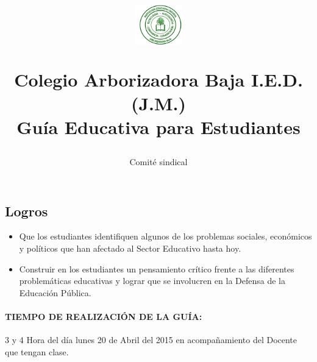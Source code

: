 \documentclass[10pt,twoside]{article}
\author{Comité sindical}
\title{\begin{minipage}{.2\textwidth}
\includegraphics[height=1.75cm]{Images/logo-colegio.png}\end{minipage}
\begin{minipage}{.75\textwidth}
\begin{center}
Colegio Arborizadora Baja I.E.D. (J.M.)\\
Guía Educativa para Estudiantes\\
\end{center}
\end{minipage}\hfill
}
\date{}
\begin{document}
\maketitle
\subsection*{Logros}
\begin{itemize}
\item Que los estudiantes identifiquen algunos de los problemas sociales, económicos y políticos  que han afectado al Sector Educativo hasta hoy.
\item Construir en los estudiantes un pensamiento crítico frente a las diferentes problemáticas educativas y lograr que se involucren en la Defensa de la Educación Pública.
\end{itemize}
\paragraph*{TIEMPO DE REALIZACIÓN DE LA GUÍA:}3 y 4 Hora del día lunes 20 de Abril del 2015 en acompañamiento del Docente que tengan clase.
\end{document}
